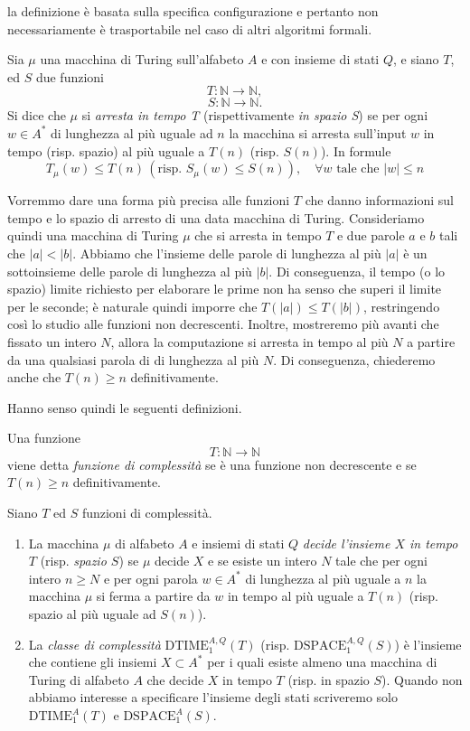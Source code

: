 la definizione è basata sulla specifica configurazione e pertanto non necessariamente è trasportabile nel caso
di altri algoritmi formali.
\begin{defi}
    \label{def:tempo di arresto}
    Sia $\mu$ una macchina di Turing sull’alfabeto $A$ e con insieme di stati $Q$, e siano $T$, ed $S$ due
funzioni
$$T : \mathbb N \to \mathbb N,$$ $$S : \mathbb N \to \mathbb N.$$
Si dice che $\mu$ si \textit{arresta in tempo T} (rispettivamente \textit{in spazio S}) se per ogni $w\in A^*$ di lunghezza al più
uguale ad $n$ la macchina si arresta sull’input $w$ in tempo (risp. spazio) al più uguale a $T(n)$ (risp. $S(n)$).
In formule
\[
T_\mu(w)\leq T(n) \, 
(\text{risp. }S_\mu(w)\leq S(n)),
 \quad \forall w \text{ tale che } {|w|\leq n}
\]
\end{defi}
\begin{rema}
Vorremmo dare una forma più precisa alle funzioni $T$ che danno informazioni sul tempo e lo spazio di arresto di una data macchina di Turing.
Consideriamo quindi una macchina di Turing $\mu$ che si arresta in tempo $T$ e due parole $a$ e $b$ tali che $|a| < |b|$. Abbiamo che l'insieme delle parole di lunghezza al più $|a|$ è un sottoinsieme delle parole di lunghezza al più $|b|$. Di conseguenza, il tempo (o lo spazio) limite richiesto per elaborare le prime non ha senso che superi il limite per le seconde; è naturale quindi imporre che $T(|a|) \leq T(|b|)$, restringendo così lo studio alle funzioni non decrescenti. 
Inoltre, mostreremo più avanti che
fissato un intero $N$,
allora 
la computazione si arresta in tempo al più $N$
a partire da una qualsiasi parola di 
di lunghezza al più $N$.
Di conseguenza, chiederemo anche che $T(n)\geq n$
definitivamente.
\end{rema}
Hanno senso quindi le seguenti definizioni.
\begin{defi}
 Una funzione
\[
T : \mathbb N \to \mathbb N
\]
viene detta \textit{funzione di complessità} se è una funzione non decrescente e se $T(n) \geq  n$ definitivamente.
\end{defi}
\begin{defi}

Siano $T$ ed $S$ funzioni di complessità.
\begin{enumerate}
    \item La macchina $\mu$ di alfabeto $A$ e insiemi di stati $Q$ \emph{decide l'insieme $X$ in tempo $T$} (risp. \emph{spazio $S$}) se $\mu$ decide $X$ e se esiste un intero $N$ tale che per ogni intero $n \geq N$ e per ogni parola $w \in A^*$ di lunghezza al più uguale a $n$ la macchina $\mu$ si ferma a partire da $w$ in tempo al più uguale a $T(n)$ (risp. spazio al più uguale ad $S(n)$).

\item  La \textit{classe di complessità} $\mathrm{DTIME}_1^{A,Q}(T)$ (risp. $\mathrm{DSPACE}_1^{A,Q}(S)$) è l'insieme che contiene gli insiemi $X \subset A^*$ per i quali esiste almeno una macchina di Turing di alfabeto $A$ che decide $X$ in tempo $T$ (risp. in spazio $S$).
Quando non abbiamo interesse a specificare l'insieme degli stati scriveremo solo
$\mathrm{DTIME}_1^{A}(T)$ e $\mathrm{DSPACE}_1^{A}(S)$.
\end{enumerate}
\end{defi}
